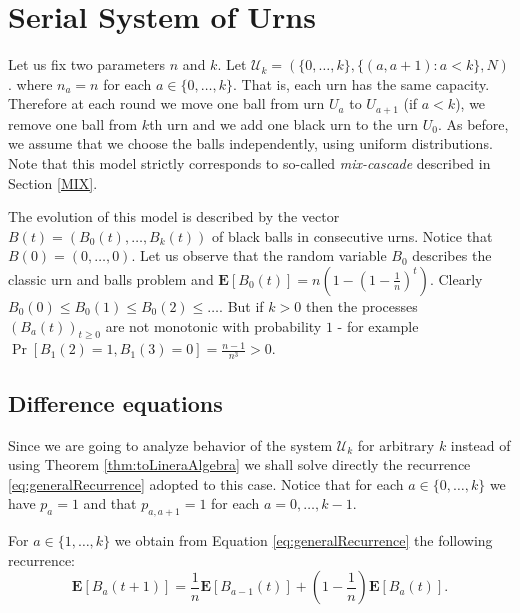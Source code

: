 \documentclass[submission]{dmtcs}
\newcommand{\E}[1]{\mathbf{E}\left[#1\right]}
\begin{document}



\section{Serial System of Urns}\label{Serial}

Let us fix two parameters $n$ and $k$.
Let $\mathcal{U}_k = (\{0,\ldots,k\},\{(a,a+1):a<k\},N)$.
where $n_a = n$ for each $a \in \{0,\ldots,k\}$. That is, each urn has the same capacity.
Therefore at each round we move one ball from urn $U_a$ to $U_{a+1}$ (if $a<k$), we remove
one ball from $k$th urn and we add one black urn to the urn $U_0$.
As before, we assume that we choose the balls independently, using uniform distributions.
Note that this model strictly corresponds to so-called \textit{mix-cascade} described in Section \ref{MIX}. 

The evolution of this model is described by the vector 
$B(t) = (B_0(t),\ldots,B_k(t))$
of black balls in consecutive urns. Notice that $B(0) = (0,\ldots,0)$.
Let us observe that the random variable $B_0$ describes the 
classic urn and balls problem and $\E{B_0(t)} = n\left(1- \left(1-\frac1n\right)^t\right)$.
Clearly $B_0(0)\leq B_0(1) \leq B_0(2)\leq \ldots$. 
But if $k>0$ then the processes $(B_a(t))_{t\geq 0}$ are not monotonic with probability $1$ - 
for example $\Pr[B_1(2)=1, B_1(3)=0] = \frac{n-1}{n^3} > 0$.



\subsection{Difference equations}

Since we are going to analyze behavior of the system $\mathcal{U}_k$
for arbitrary $k$ instead of using Theorem \ref{thm:toLineraAlgebra} 
we shall solve directly the recurrence \ref{eq:generalRecurrence} 
adopted to this case.
Notice that for each $a\in\{0,\ldots,k\}$ we have $p_a=1$ and that 
$p_{a,a+1} = 1$ for each $a=0,\ldots,k-1$. 

For  $a \in \{1,\ldots,k\}$ we obtain from Equation \ref{eq:generalRecurrence}
the following recurrence: 
\begin{equation}
\label{eq:Ya}
    \E{B_{a}(t+1)} = \frac{1}{n} \E{B_{a-1}(t)} +(1-\frac{1}{n}) \E{B_{a}(t)}.
\end{equation}
\end{document}
